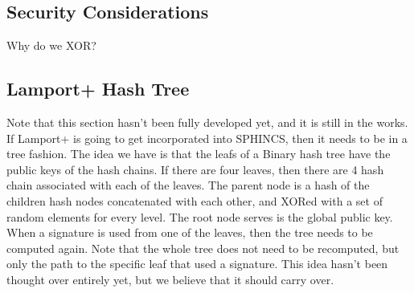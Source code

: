 \documentclass[]{scrartcl}
\begin{document}
%

\subsection*{Security Considerations}
Why do we XOR?

\subsection*{Lamport+ Hash Tree}
Note that this section hasn't been fully developed yet, and it is still in the works. If Lamport+ is going to get incorporated into SPHINCS, then it needs to be in a tree fashion. The idea we have is that the leafs of a Binary hash tree have the public keys of the hash chains. If there are four leaves, then there are 4 hash chain associated with each of the leaves. The parent node is a hash of the children hash nodes concatenated with each other, and XORed with a set of random elements for every level. The root node serves is the global public key.\\
When a signature is used from one of the leaves, then the tree needs to be computed again. Note that the whole tree does not need to be recomputed, but only the path to the specific leaf that used a signature. This idea hasn't been thought over entirely yet, but we believe that it should carry over.
\end{document}
